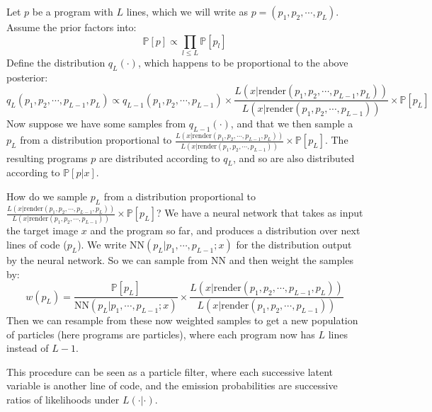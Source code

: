 \documentclass{article}
\newcommand{\probability}{\mathds{P}} %
\begin{document}
Let $p$ be a program with $L$ lines, which we will write as $p = (p_1,p_2,\cdots,p_L)$. Assume the prior factors into:
\begin{equation}
  \probability [p]\propto \prod_{l\leq L}\probability [p_l]
\end{equation}
Define the distribution $q_L(\cdot)$, which happens to be proportional to the above posterior:
\begin{equation}
  q_L(p_1,p_2,\cdots,p_{L - 1},p_L)\propto q_{L - 1}(p_1,p_2,\cdots,p_{L - 1})\times \frac{L(x | \text{render}(p_1,p_2,\cdots,p_{L - 1},p_L))}{L(x | \text{render}(p_1,p_2,\cdots,p_{L - 1}))}\times\probability [p_L]
\end{equation}
Now suppose we have some samples from $q_{L - 1}(\cdot)$, and that we
then sample a $p_L$ from a distribution proportional to $\frac{L(x |
  \text{render}(p_1,p_2,\cdots,p_{L - 1},p_L))}{L(x |
  \text{render}(p_1,p_2,\cdots,p_{L - 1}))}\times\probability [p_L]$.
The resulting programs $p$ are distributed according to $q_L$, and so
are also distributed according to $\probability [p|x]$.

How do we sample $p_L$ from a distribution proportional to $\frac{L(x
  | \text{render}(p_1,p_2,\cdots,p_{L - 1},p_L))}{L(x |
  \text{render}(p_1,p_2,\cdots,p_{L - 1}))}\times\probability [p_L]$?
We have a neural network that takes as input the target image $x$ and
the program so far, and produces a distribution over next lines of
code ($p_L$).  We write $\text{NN}(p_L | p_1,\cdots,p_{L - 1};x)$ for
the distribution output by the neural network. So we can sample from NN and then weight the samples by:
\begin{equation}
  w(p_L) = \frac{\probability [p_L]}{\text{NN}(p_L | p_1,\cdots,p_{L - 1};x)}\times \frac{L(x | \text{render}(p_1,p_2,\cdots,p_{L - 1},p_L))}{L(x | \text{render}(p_1,p_2,\cdots,p_{L - 1}))}
\end{equation}
Then we can resample from these now weighted samples to get a new
population of particles (here programs are particles), where each
program now has $L$ lines instead of $L - 1$.

This procedure can be seen as a particle filter, where each successive
latent variable is another line of code, and the emission
probabilities are successive ratios of likelihoods under $L(\cdot |
\cdot)$.
\end{document}
